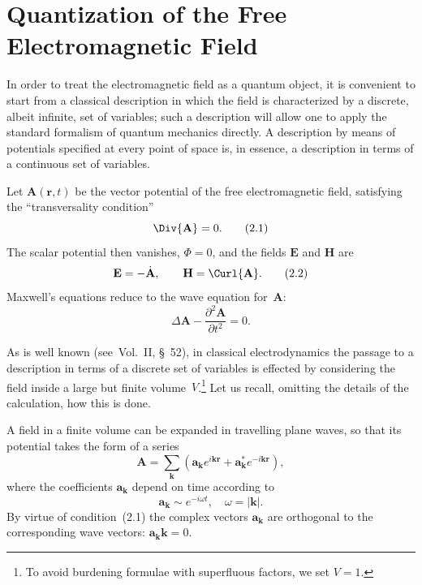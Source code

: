 \section{Quantization of the Free Electromagnetic Field}

In order to treat the electromagnetic field as a quantum object, it is convenient to start from a classical description in which the field is characterized by a discrete, albeit infinite, set of variables; such a description will allow one to apply the standard formalism of quantum mechanics directly. A description by means of potentials specified at every point of space is, in essence, a description in terms of a continuous set of variables.

Let $\mathbf{A}(\mathbf{r},t)$ be the vector potential of the free electromagnetic field, satisfying the ``transversality condition''
\begin{equation}
\Div{\mathbf{A}} = 0.
\tag{2.1}
\end{equation}
The scalar potential then vanishes, $\Phi = 0$, and the fields $\mathbf{E}$ and $\mathbf{H}$ are
\begin{equation}
\mathbf{E} = -\dot{\mathbf{A}}, \qquad \mathbf{H} = \Curl{\mathbf{A}}.
\tag{2.2}
\end{equation}
Maxwell's equations reduce to the wave equation for~$\mathbf{A}$:
\begin{equation}
\Delta\mathbf{A} - \frac{\partial^2 \mathbf{A}}{\partial t^2} = 0.
\tag{2.3}
\end{equation}

As is well known (see~Vol.~II, \S~52), in classical electrodynamics the passage to a description in terms of a discrete set of variables is effected by considering the field inside a large but finite volume~$V$.\footnote{To avoid burdening formulae with superfluous factors, we set $V = 1$.} Let us recall, omitting the details of the calculation, how this is done.

A field in a finite volume can be expanded in travelling plane waves, so that its potential takes the form of a series
\begin{equation}
\mathbf{A} = \sum_{\mathbf{k}} (\mathbf{a}_{\mathbf{k}} e^{i\mathbf{kr}} + \mathbf{a}_{\mathbf{k}}^* e^{-i\mathbf{kr}}),
\tag{2.4}
\end{equation}
where the coefficients $\mathbf{a}_{\mathbf{k}}$ depend on time according to
\begin{equation}
\mathbf{a}_{\mathbf{k}} \sim e^{-i\omega t}, \quad \omega = |\mathbf{k}|.
\tag{2.5}
\end{equation}
By virtue of condition~(2.1) the complex vectors $\mathbf{a}_{\mathbf{k}}$ are orthogonal to the corresponding wave vectors: $\mathbf{a}_{\mathbf{k}} \mathbf{k} = 0$.

